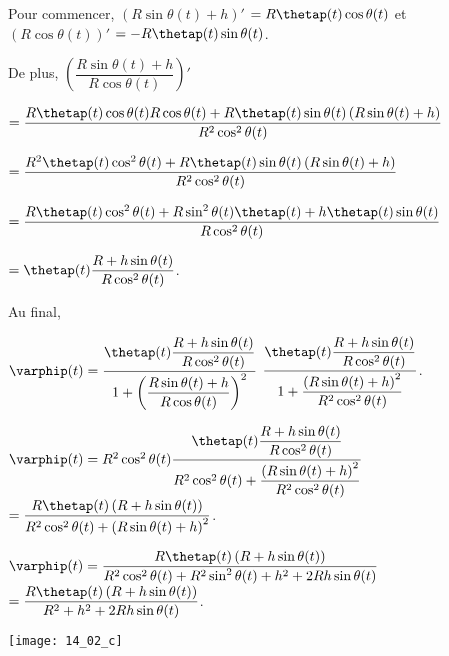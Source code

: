 Pour commencer, $\left( R\sin\theta(t)+h\right)'$ $=R\thetap(t)\cos\theta(t) $
et $\left( R \cos\theta(t)\right)'$ $=- R \thetap(t)\sin\theta(t)$.

De plus, 
$\left( \dfrac{R\sin\theta(t)+h}{R \cos\theta(t)}\right)'$

$ = \dfrac{R\thetap(t)\cos\theta(t) R \cos\theta(t) + R \thetap(t)\sin\theta(t) \left( R\sin\theta(t)+h\right) }{ R^2 \cos^2\theta(t)}$

$ = \dfrac{R^2\thetap(t)\cos^2\theta(t)  + R \thetap(t)\sin\theta(t) \left( R\sin\theta(t)+h\right) }{ R^2 \cos^2\theta(t)}$


$ = \dfrac{R\thetap(t)\cos^2\theta(t)  +   R\sin^2\theta(t)\thetap(t)+h\thetap(t)\sin\theta(t)}{ R \cos^2\theta(t)}$

$ = \thetap(t)\dfrac{R+h\sin\theta(t)}{ R \cos^2\theta(t)}$.


Au final, 

$ \varphip(t) =  \dfrac{\thetap(t)\dfrac{R+h\sin\theta(t)}{ R \cos^2\theta(t)}}{1+\left( \dfrac{R\sin\theta(t)+h}{R \cos\theta(t)}\right)^2}$
$   \dfrac{\thetap(t)\dfrac{R+h\sin\theta(t)}{ R \cos^2\theta(t)}}{1+ \dfrac{\left(R\sin\theta(t)+h\right)^2}{R^2 \cos^2\theta(t)}}$.

$ \varphip(t) =  R^2 \cos^2\theta(t) \dfrac{\thetap(t)\dfrac{R+h\sin\theta(t)}{ R \cos^2\theta(t)}}{R^2 \cos^2\theta(t)+ \dfrac{\left(R\sin\theta(t)+h\right)^2}{R^2 \cos^2\theta(t)}}$
$ =  \dfrac{R \thetap(t)\left(R+h\sin\theta(t)\right)}{R^2 \cos^2\theta(t)+ \left(R\sin\theta(t)+h\right)^2}$.

$ \varphip(t) =  \dfrac{R \thetap(t)\left(R+h\sin\theta(t)\right)}{R^2 \cos^2\theta(t)+ R^2\sin^2\theta(t)+h^2+2 Rh\sin\theta(t)}$
$ =  \dfrac{R \thetap(t)\left(R+h\sin\theta(t)\right)}{R^2+h^2+2 Rh\sin\theta(t)}$.

\else
\fi

\ifprof

\begin{center}
\texttt{[image: 14\_02\_c]}
\end{center}

